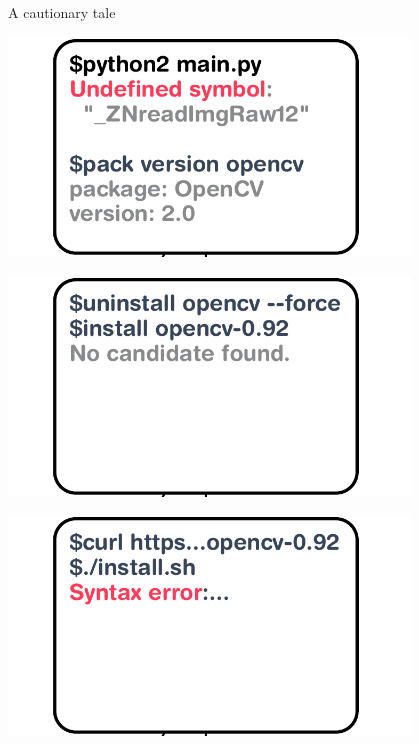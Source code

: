 \documentclass[aspectratio=169]{beamer}
\begin{document}
\begin{frame}{A cautionary tale}
{\begin{center}
        \end{center}
    }
     {
        \huge {}
        \begin{center}
        \includegraphics[width=0.8\textwidth]{img/princess-comics-try-3.pdf}
        \end{center}
    }
     {
        \huge {}
        \begin{center}
        \includegraphics[width=0.8\textwidth]{img/princess-comics-try-5.pdf}
        \end{center}
    }
     {
        \huge {}
        \begin{center}
        \includegraphics[width=0.8\textwidth]{img/princess-comics-try-6.pdf}
        \end{center}
}
\end{frame}
\end{document}
